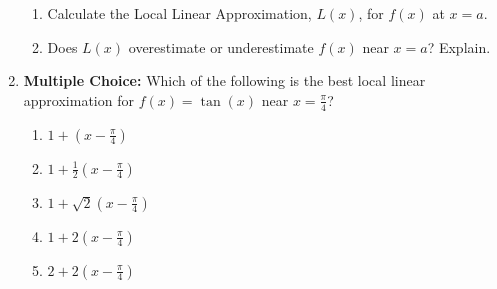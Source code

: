 \documentclass[12pt]{article}
\newif\ifans
\begin{document}
\begin{enumerate}
\begin{enumerate}
\item Calculate the Local Linear Approximation, $L(x)$, for $f(x)$ at $x=a$.

\ifans{\fbox{$L(x)=2ax-a^2$}} \fi

\item Does $L(x)$ overestimate or underestimate $f(x)$ near $x=a$?  Explain.

\ifans{\fbox{\parbox{1\linewidth}{$L(x)$ is always an underestimate of $f(x)$ for $x$ near $a$.  Graphically, this should make sense since the tangent line to $f(x)=x^2$ is always below its graph.\\
\\
To show that $L(x)$ is always an underestimate, we will show that $L(x)\leq f(x)$ for all values of $x$.  In other words, we will show that $L(x)-f(x) \leq0$ for all $x$.  So, we compute:

\begin{align*}
L(x)-f(x) &= 2ax-a^2-x^2\\
&=-(x^2-2ax+a^2)\\
&=-(x-a)^2\\
& \leq0
\end{align*}
}}} \fi

\end{enumerate}

\item {\bf Multiple Choice:} Which of the following is the best local linear approximation for $f(x)=\tan(x)$ near $\displaystyle x=\frac{\pi}{4}$?

\begin{enumerate}

\item  $\displaystyle 1+\left(x-\frac{\pi}{4}\right)$

\item $\displaystyle 1+ \frac{1}{2}\left(x-\frac{\pi}{4}\right)$

\item  $\displaystyle 1+\sqrt{2}\left(x-\frac{\pi}{4}\right)$

\item  $\displaystyle 1+2\left(x-\frac{\pi}{4}\right)$

\item $\displaystyle 2+2\left(x-\frac{\pi}{4}\right)$

\end{enumerate}

\ifans{\fbox{D}} \fi

\end{enumerate}
\end{document}
